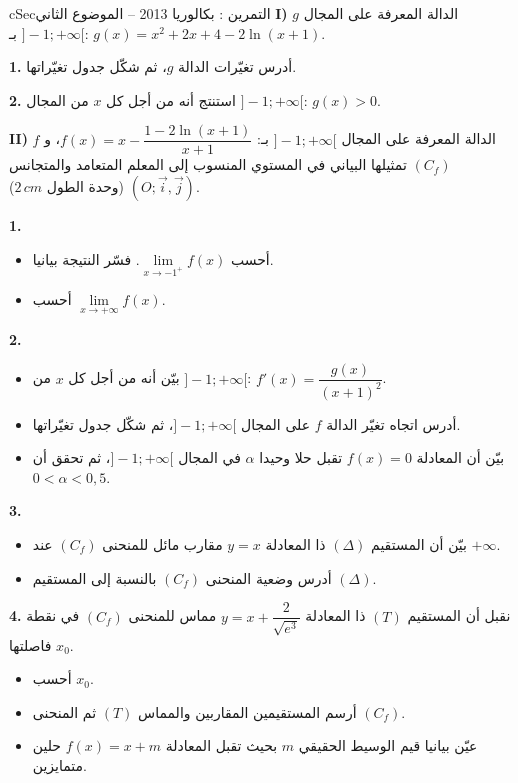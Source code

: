 \documentclass[12pt,a4paper]{article}
\newenvironment{BOX}[2]{\begin{otherlanguage}{english}\begin{arbox}{#1}{#2}}{\end{arbox}\end{otherlanguage}}
\newcounter{exo}
\newenvironment{tamrin}[1]{\stepcounter{exo}\begin{BOX}{cSec}{التمرين \theexo: #1}}{\end{BOX}}
\newenvironment{sq}{\begin{itemize}[leftmargin=2.4em,itemsep=3pt]}{\end{itemize}}
\newcommand{\qa}{\item[(أ)]}\newcommand{\qb}{\item[(ب)]}\newcommand{\qc}{\item[(جـ)]}\newcommand{\qd}{\item[(د)]}\newcommand{\qe}{\item[(هـ)]}
\newcommand{\QQ}[1]{\par\smallskip\textbf{#1.} }
\begin{document}
\begin{tamrin}{بكالوريا 2013 -- الموضوع الثاني}
\textbf{I)} $g$ الدالة المعرفة على المجال $]-1;+\infty[$ بـ: $g(x)=x^2+2x+4-2\ln(x+1)$.
\QQ{1} أدرس تغيّرات الدالة $g$، ثم شكّل جدول تغيّراتها.
\QQ{2} استنتج أنه من أجل كل $x$ من المجال $]-1;+\infty[$: $g(x)>0$.

\textbf{II)} $f$ الدالة المعرفة على المجال $]-1;+\infty[$ بـ: $f(x)=x-\dfrac{1-2\ln(x+1)}{x+1}$،
و $(C_f)$ تمثيلها البياني في المستوي المنسوب إلى المعلم المتعامد والمتجانس $(O;\vec i,\vec j)$ (وحدة الطول $2\,cm$).
\QQ{1}
\begin{sq}
\qa أحسب $\lim\limits_{x\to -1^{+}}f(x)$. فسّر النتيجة بيانيا.
\qb أحسب $\lim\limits_{x\to +\infty}f(x)$.
\end{sq}
\QQ{2}
\begin{sq}
\qa بيّن أنه من أجل كل $x$ من $]-1;+\infty[$: $f'(x)=\dfrac{g(x)}{(x+1)^2}$.
\qb أدرس اتجاه تغيّر الدالة $f$ على المجال $]-1;+\infty[$، ثم شكّل جدول تغيّراتها.
\qc بيّن أن المعادلة $f(x)=0$ تقبل حلا وحيدا $\alpha$ في المجال $]-1;+\infty[$، ثم تحقق أن $0<\alpha<0{,}5$.
\end{sq}
\QQ{3}
\begin{sq}
\qa بيّن أن المستقيم $(\Delta)$ ذا المعادلة $y=x$ مقارب مائل للمنحنى $(C_f)$ عند $+\infty$.
\qb أدرس وضعية المنحنى $(C_f)$ بالنسبة إلى المستقيم $(\Delta)$.
\end{sq}
\QQ{4} نقبل أن المستقيم $(T)$ ذا المعادلة $y=x+\dfrac{2}{\sqrt{e^3}}$ مماس للمنحنى $(C_f)$ في نقطة فاصلتها $x_0$.
\begin{sq}
\qa أحسب $x_0$.
\qb أرسم المستقيمين المقاربين والمماس $(T)$ ثم المنحنى $(C_f)$.
\qc عيّن بيانيا قيم الوسيط الحقيقي $m$ بحيث تقبل المعادلة $f(x)=x+m$ حلين متمايزين.
\end{sq}
\end{tamrin}
\end{document}
